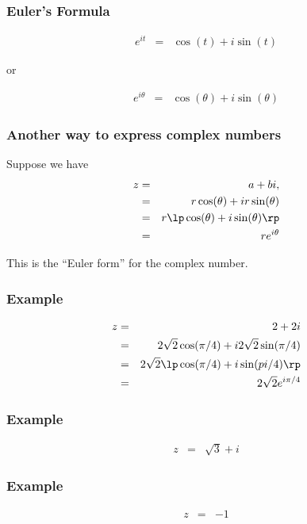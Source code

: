 \begin{frame}
  \frametitle{Euler's Formula}

  \begin{eqnarray*}
    e^{it} & = & \cos(t) + i\sin(t)
  \end{eqnarray*}

  or

  \begin{eqnarray*}
    e^{i\theta} & = & \cos(\theta) + i\sin(\theta)
  \end{eqnarray*}
  
\end{frame}

\begin{frame}
  \frametitle{Another way to express complex numbers}

  Suppose we have
  \begin{eqnarray*}
    z & = & a + bi, \\
    & = & r\cos(\theta) + ir\sin(\theta) \\
    & = & r \lp \cos(\theta) + i\sin(\theta) \rp \\
    & = & r e^{i\theta}
  \end{eqnarray*}

  This is the ``Euler form'' for the complex number.

\end{frame}

\begin{frame}
  \frametitle{Example}
  
  \begin{eqnarray*}
    z & = & 2 + 2i \\
    & = & 2\sqrt{2} \cos(\pi/4) + i 2\sqrt{2} \sin(\pi/4) \\
    & = & 2\sqrt{2} \lp \cos(\pi/4) + i\sin(pi/4) \rp \\
    & = & 2\sqrt{2} e^{i\pi/4}
  \end{eqnarray*}
\end{frame}

\begin{frame}
  \frametitle{Example}
  \begin{eqnarray*}
    z & = & \sqrt{3} + i 
  \end{eqnarray*}
\end{frame}

\begin{frame}
  \frametitle{Example}
  \begin{eqnarray*}
    z & = & -1
  \end{eqnarray*}
\end{frame}


